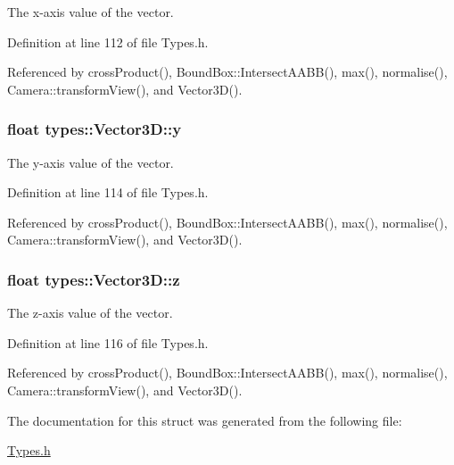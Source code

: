 The x-\/axis value of the vector. 



Definition at line 112 of file Types.\+h.



Referenced by cross\+Product(), Bound\+Box\+::\+Intersect\+A\+A\+B\+B(), max(), normalise(), Camera\+::transform\+View(), and Vector3\+D().

\hypertarget{structtypes_1_1_vector3_d_a02f330a5f3139f9cc3c5aead1728147c}{}
\subsubsection[{y}]{\setlength{\rightskip}{0pt plus 5cm}float types\+::\+Vector3\+D\+::y}\label{structtypes_1_1_vector3_d_a02f330a5f3139f9cc3c5aead1728147c}


The y-\/axis value of the vector. 



Definition at line 114 of file Types.\+h.



Referenced by cross\+Product(), Bound\+Box\+::\+Intersect\+A\+A\+B\+B(), max(), normalise(), Camera\+::transform\+View(), and Vector3\+D().

\hypertarget{structtypes_1_1_vector3_d_a4266d5bca7826efcfb1fb6454affb51d}{}
\subsubsection[{z}]{\setlength{\rightskip}{0pt plus 5cm}float types\+::\+Vector3\+D\+::z}\label{structtypes_1_1_vector3_d_a4266d5bca7826efcfb1fb6454affb51d}


The z-\/axis value of the vector. 



Definition at line 116 of file Types.\+h.



Referenced by cross\+Product(), Bound\+Box\+::\+Intersect\+A\+A\+B\+B(), max(), normalise(), Camera\+::transform\+View(), and Vector3\+D().



The documentation for this struct was generated from the following file\+:\begin{DoxyCompactItemize}
\item 
\hyperlink{_types_8h}{Types.\+h}\end{DoxyCompactItemize}
